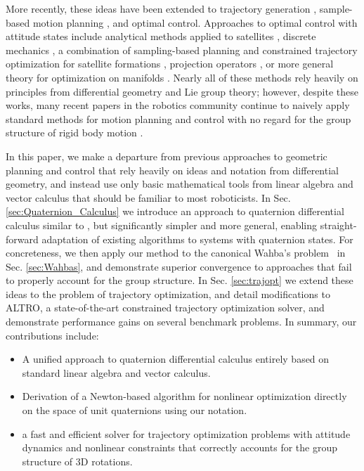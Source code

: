 \documentclass[letterpaper, 10 pt, conference]{ieeeconf}  %
\begin{document}
    More recently, these ideas have been extended to trajectory generation
    \cite{Zefran1998}, sample-based motion planning \cite{Zefran1999,Kuffner2004}, and
    optimal control. Approaches to optimal control with attitude states include
    analytical methods applied to satellites \cite{Spindler1998}, discrete mechanics
    \cite{Kobilarov2011,Kobilarov2014, Lee2008}, a combination of sampling-based planning
    and constrained trajectory optimization for satellite formations \cite{Garcia2005,
    Aoude2008}, projection operators \cite{Saccon2013}, or more general theory for
    optimization on manifolds \cites{watterson2018trajectory}. Nearly all of these
    methods rely heavily on principles from differential geometry and Lie group theory;
    however, despite these works, many recent papers in the robotics community continue
    to naively apply standard methods for motion planning and control with no regard for the
    group structure of rigid body motion \cite{Alothman2016,deCrousaz2015,
    Williams2017,Geisert2016}.
    
    In this paper, we make a departure from previous approaches to geometric planning and 
    control that rely heavily on ideas and notation from differential geometry, 
    and instead use only basic mathematical tools from linear algebra and vector calculus that 
    should be familiar to most roboticists. In Sec. \ref{sec:Quaternion_Calculus} we introduce 
    an approach to quaternion differential calculus similar to \cite{Mandic2011,Xu2016}, but significantly simpler and more general, enabling straight-forward adaptation of 
    existing algorithms to systems with quaternion states. 
    For concreteness, we then apply our method to the canonical
    Wahba's problem~\cite{Wahba1965} in Sec. \ref{sec:Wahbas}, and demonstrate superior convergence to approaches that
    fail to properly account for the group structure. 
    In Sec. \ref{sec:trajopt} we extend these ideas to the problem of trajectory optimization,
    and detail modifications to ALTRO, a state-of-the-art constrained trajectory optimization
    solver, and demonstrate performance gains on several benchmark problems.
    In summary, our contributions include:

    \begin{itemize}
        \item A unified approach to quaternion differential calculus entirely based on standard linear algebra and vector calculus.
        \item Derivation of a Newton-based algorithm for nonlinear optimization directly on the space of unit quaternions using our notation.
        \item a fast and efficient solver for trajectory optimization problems with 
        attitude dynamics and nonlinear constraints that correctly accounts for the group
        structure of 3D rotations.
    \end{itemize}
\end{document}
